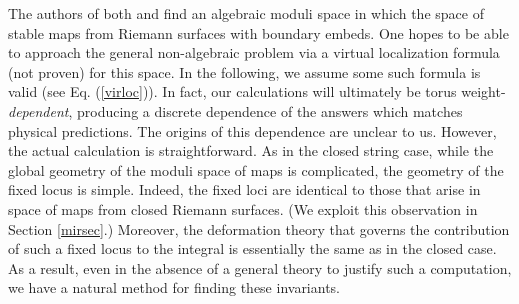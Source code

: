 \documentclass[a4paper,11pt]{article}
\begin{document}
The authors of both \cite{KL} and \cite{LS} find an
algebraic moduli space in which the space of stable
maps from Riemann surfaces with boundary embeds.
One hopes to be able to approach the general
non-algebraic problem via a virtual localization
formula (not proven) for this space.
In the following, we assume some such formula is
valid (see Eq.\!\!\! (\ref{virloc})).
In fact, our calculations will ultimately be
torus weight-{\em dependent}, producing a discrete
dependence of the answers which matches
physical predictions.
The origins of this dependence are unclear to us.
However, the actual calculation is straightforward.
As in the closed string case, while the global geometry
of the moduli space of maps is complicated, the
geometry of the fixed locus is simple.  Indeed,
the fixed loci are identical to those that arise
in space of maps from closed Riemann surfaces.
(We exploit this observation in Section \ref{mirsec}.)
Moreover, the deformation theory that governs
the contribution of such a fixed locus to
the integral is essentially the same
as in the closed case.  As a result, even
in the absence of a general theory to justify
such a computation, we have a natural method
for finding these invariants.
\end{document}
